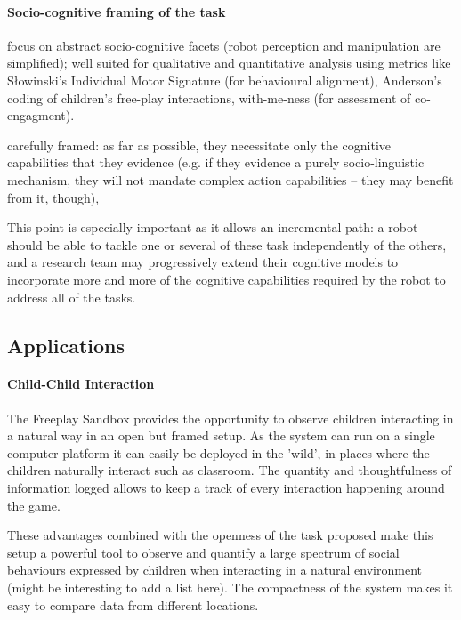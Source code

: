 \documentclass[sigconf]{acmart}
\begin{document}
\paragraph{Socio-cognitive framing of the task}

focus on abstract socio-cognitive facets (robot
perception and manipulation are simplified); well suited for qualitative and
quantitative analysis using metrics like Słowinski’s Individual Motor Signature
(for behavioural alignment), Anderson's~\cite{anderson2004social} coding of children’s free-play
interactions, with-me-ness (for assessment of co-engagment).

carefully framed: as far as possible, they necessitate only the cognitive
capabilities that they evidence (e.g. if they evidence a purely socio-linguistic
mechanism, they will not mandate complex action capabilities – they may benefit
from it, though),

This point is especially important as it allows an incremental path: a robot
should be able to tackle one or several of these task independently of the
others, and a research team may progressively extend their cognitive models to
incorporate more and more of the cognitive capabilities required by the robot to
address all of the tasks.

\subsection{Applications}
\label{sec:applications}

\paragraph{Child-Child Interaction}

The Freeplay Sandbox provides the opportunity to observe children interacting in a natural way in an open but framed setup. As the system can run on a single computer platform it can easily be deployed in the 'wild', in places where the children naturally interact such as classroom. The quantity and thoughtfulness of information logged allows to keep a track of every interaction happening around the game. 

These advantages combined with the openness of the task proposed make this setup a powerful tool to observe and quantify a large spectrum of social behaviours expressed by children when interacting in a natural environment (might be interesting to add a list here). The compactness of the system makes it easy to compare data from different locations.
\end{document}
